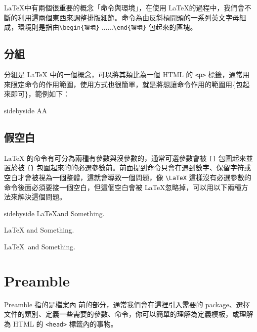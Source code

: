 \LaTeX 中有兩個很重要的概念「命令與環境」，在使用 \LaTeX 的過程中，我們會不斷的利用這兩個東西來調整排版細節。命令為由反斜槓開頭的一系列英文字母組成，環境則是指由\verb|\begin{環境}| ......\verb|\end{環境}| 包起來的區塊。


\subsection{分組}

分組是 LaTeX 中的一個概念，可以將其類比為一個 HTML 的 \verb|<p>| 標籤，通常用來限定命令的作用範圍，使用方式也很簡單，就是將想讓命令作用的範圍用\{包起來即可\}，範例如下：

\begin{tcblisting}{sidebyside}
{\large A}A
\end{tcblisting}

\subsection{假空白}

LaTeX 的命令有可分為兩種有參數與沒參數的，通常可選參數會被 \verb|[]| 包圍起來並置於被 \verb|{}| 包圍起來的的必選參數前。前面提到命令只會在遇到數字、保留字符或空白才會被視為一個整體，這就會導致一個問題，像 \verb`\LaTeX` 這樣沒有必選參數的命令後面必須要接一個空白，但這個空白會被 \LaTeX 忽略掉，可以用以下兩種方法來解決這個問題。

\begin{tcblisting}{sidebyside}
\LaTeX and Something. %

\LaTeX{} and Something.%

\LaTeX\ and Something.%
\end{tcblisting}

\section{Preamble}

Preamble 指的是檔案內 \verb|| 前的部分，通常我們會在這裡引入需要的 package、選擇文件的類別、定義一些需要的參數、命令，你可以簡單的理解為定義模板，或理解為 HTML 的 \verb|<head>| 標籤內的事物。

